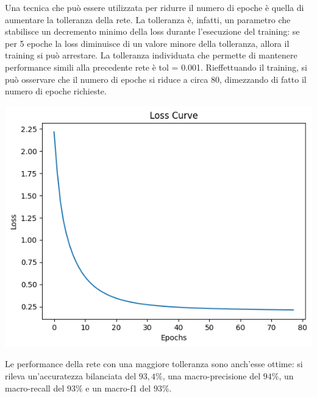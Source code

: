Una tecnica che può essere utilizzata per ridurre il numero di epoche
è quella di aumentare la tolleranza della rete.
La tolleranza è, infatti, un parametro che stabilisce un decremento minimo
della loss durante l'esecuzione del training: se per 5 epoche la loss
diminuisce di un valore minore della tolleranza, allora il training si può
arrestare.
La tolleranza individuata che permette di mantenere performance simili alla
precedente rete è tol = 0.001. Rieffettuando il training, si può osservare che 
il numero di epoche si riduce a circa 80, dimezzando di fatto il numero
di epoche richieste.

\begin{Figure}
    \centering
    \includegraphics[width=\linewidth]{img/mlp_high_loss.png}
\end{Figure}

Le performance della rete con una maggiore tolleranza sono anch'esse ottime:
si rileva un'accuratezza bilanciata del $93,4\%$, una macro-precisione 
del $94\%$, un macro-recall del $93\%$ e un macro-f1 del $93\%$.

